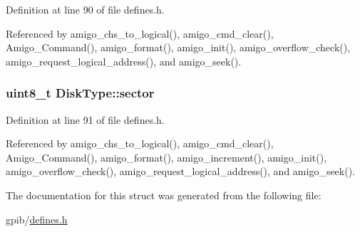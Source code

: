 Definition at line 90 of file defines.\-h.



Referenced by amigo\-\_\-chs\-\_\-to\-\_\-logical(), amigo\-\_\-cmd\-\_\-clear(), Amigo\-\_\-\-Command(), amigo\-\_\-format(), amigo\-\_\-init(), amigo\-\_\-overflow\-\_\-check(), amigo\-\_\-request\-\_\-logical\-\_\-address(), and amigo\-\_\-seek().

\hypertarget{structDiskType_a6f0a12d4184ccb30a7a5e6e6e713ca85}{
\subsubsection[{sector}]{\setlength{\rightskip}{0pt plus 5cm}uint8\-\_\-t Disk\-Type\-::sector}}\label{structDiskType_a6f0a12d4184ccb30a7a5e6e6e713ca85}


Definition at line 91 of file defines.\-h.



Referenced by amigo\-\_\-chs\-\_\-to\-\_\-logical(), amigo\-\_\-cmd\-\_\-clear(), Amigo\-\_\-\-Command(), amigo\-\_\-format(), amigo\-\_\-increment(), amigo\-\_\-init(), amigo\-\_\-overflow\-\_\-check(), amigo\-\_\-request\-\_\-logical\-\_\-address(), and amigo\-\_\-seek().



The documentation for this struct was generated from the following file\-:\begin{DoxyCompactItemize}
\item 
gpib/\hyperlink{defines_8h}{defines.\-h}\end{DoxyCompactItemize}
